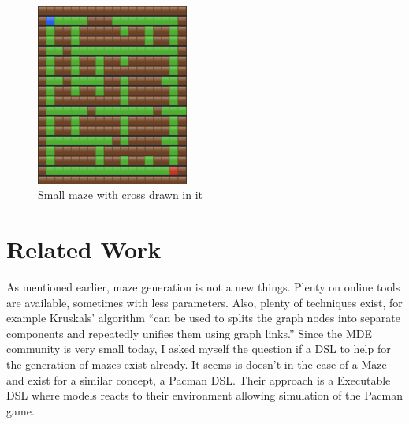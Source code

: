 \documentclass[review]{elsarticle}
\begin{document}
\begin{figure}
	\includegraphics[width=50mm]{maze_draw.png}
	\centering
	\caption{Small maze with cross drawn in it}
	\label{fig:maze_draw}
\end{figure}

\section{Related Work}
As mentioned earlier, maze generation is not a new things. Plenty on online tools are available, sometimes with less parameters\cite{noauthor_maze_nodate}. Also, plenty of techniques exist, for example Kruskals’ algorithm ``can be used to splits the graph nodes into separate components and repeatedly unifies them using graph links\cite{bouda_day_2017}.'' Since the MDE community is very small today, I asked myself the question if a DSL to help for the generation of mazes exist already. It seems is doesn't in the case of a Maze and exist for a similar concept, a Pacman DSL\cite{leroy_create_nodate}. Their approach is a Executable DSL where models reacts to their environment allowing simulation of the Pacman game.
\end{document}
